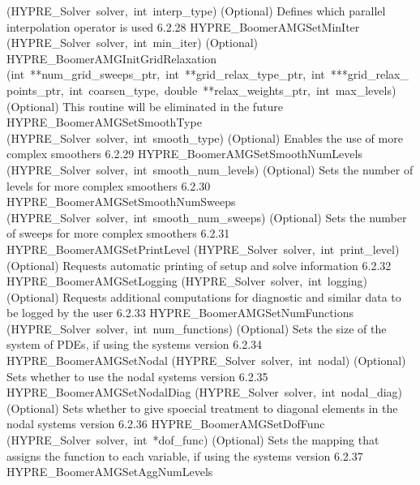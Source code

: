 \documentclass{article}
\begin{document}
\begin{cxxentry}
\begin{cxxentry}
\begin{cxxnames}
        {(HYPRE\_Solver\ solver,\ int\ interp\_type)}
        {
(Optional) Defines which parallel interpolation operator is used}
        {6.2.28}
        {HYPRE\_BoomerAMGSetMinIter}
        {(HYPRE\_Solver\ solver,\ int\ min\_iter)}
        {
(Optional)}
        {}
\label{cxx.6.2.62}
        {HYPRE\_BoomerAMGInitGridRelaxation}
        {(int\ **num\_grid\_sweeps\_ptr,\ int\ **grid\_relax\_type\_ptr,\ int\ ***grid\_relax\_points\_ptr,\ int\ coarsen\_type,\ double\ **relax\_weights\_ptr,\ int\ max\_levels)}
        {
(Optional) This routine will be eliminated in the future}
        {}
\label{cxx.6.2.63}
        {HYPRE\_BoomerAMGSetSmoothType}
        {(HYPRE\_Solver\ solver,\ int\ smooth\_type)}
        {
(Optional) Enables the use of more complex smoothers}
        {6.2.29}
        {HYPRE\_BoomerAMGSetSmoothNumLevels}
        {(HYPRE\_Solver\ solver,\ int\ smooth\_num\_levels)}
        {
(Optional) Sets the number of levels for more complex smoothers}
        {6.2.30}
        {HYPRE\_BoomerAMGSetSmoothNumSweeps}
        {(HYPRE\_Solver\ solver,\ int\ smooth\_num\_sweeps)}
        {
(Optional) Sets the number of sweeps for more complex smoothers}
        {6.2.31}
        {HYPRE\_BoomerAMGSetPrintLevel}
        {(HYPRE\_Solver\ solver,\ int\ print\_level)}
        {
(Optional) Requests automatic printing of setup and solve information}
        {6.2.32}
        {HYPRE\_BoomerAMGSetLogging}
        {(HYPRE\_Solver\ solver,\ int\ logging)}
        {
(Optional) Requests additional computations for diagnostic and similar
data to be logged by the user}
        {6.2.33}
        {HYPRE\_BoomerAMGSetNumFunctions}
        {(HYPRE\_Solver\ solver,\ int\ num\_functions)}
        {
(Optional) Sets the size of the system of PDEs, if using the systems version}
        {6.2.34}
        {HYPRE\_BoomerAMGSetNodal}
        {(HYPRE\_Solver\ solver,\ int\ nodal)}
        {
(Optional) Sets whether to use the nodal systems version}
        {6.2.35}
        {HYPRE\_BoomerAMGSetNodalDiag}
        {(HYPRE\_Solver\ solver,\ int\ nodal\_diag)}
        {
(Optional) Sets whether to give spoecial treatment to diagonal elements in 
the nodal systems version}
        {6.2.36}
        {HYPRE\_BoomerAMGSetDofFunc}
        {(HYPRE\_Solver\ solver,\ int\ *dof\_func)}
        {
(Optional) Sets the mapping that assigns the function to each variable, 
if using the systems version}
        {6.2.37}
        {HYPRE\_BoomerAMGSetAggNumLevels}

\end{cxxnames}
\end{cxxentry}
\end{cxxentry}
\end{document}
